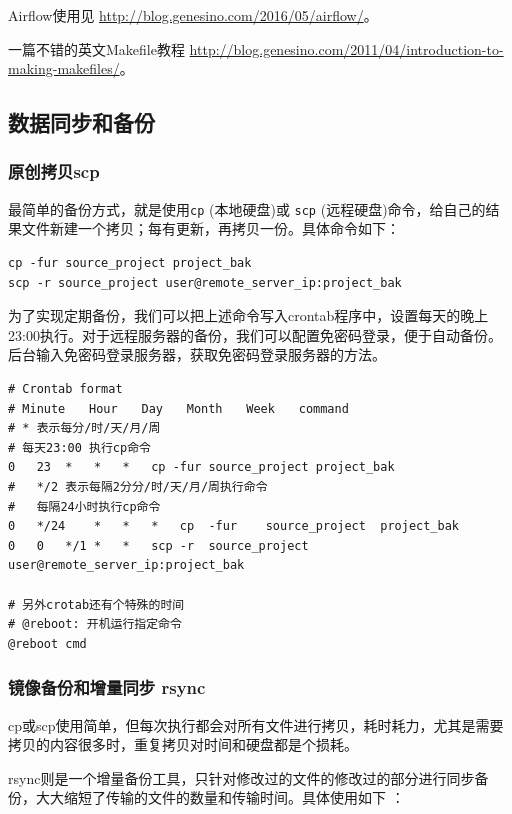 \documentclass[]{article}
\numberwithin{figure}{section}
\numberwithin{table}{section}
\begin{document}
Airflow使用见 \url{http://blog.genesino.com/2016/05/airflow/}。

一篇不错的英文Makefile教程 \url{http://blog.genesino.com/2011/04/introduction-to-making-makefiles/}。

\hypertarget{rsync}{%
\subsection{数据同步和备份}\label{rsync}}

\hypertarget{scp}{%
\subsubsection{原创拷贝scp}\label{scp}}

最简单的备份方式，就是使用\texttt{cp} (本地硬盘)或 \texttt{scp} (远程硬盘)命令，给自己的结果文件新建一个拷贝；每有更新，再拷贝一份。具体命令如下：

\begin{verbatim}
cp -fur source_project project_bak
scp -r source_project user@remote_server_ip:project_bak
\end{verbatim}

为了实现定期备份，我们可以把上述命令写入crontab程序中，设置每天的晚上23:00执行。对于远程服务器的备份，我们可以配置免密码登录，便于自动备份。后台输入免密码登录服务器，获取免密码登录服务器的方法。

\begin{verbatim}
# Crontab format
# Minute　　Hour　　Day　　Month　　Week　　command 
# * 表示每分/时/天/月/周
# 每天23:00 执行cp命令
0	23	*	*	*	cp -fur source_project project_bak
#	*/2	表示每隔2分分/时/天/月/周执行命令
#	每隔24小时执行cp命令
0	*/24	*	*	*	cp	-fur	source_project	project_bak
0	0	*/1	*	*	scp	-r	source_project	user@remote_server_ip:project_bak

# 另外crotab还有个特殊的时间
# @reboot: 开机运行指定命令
@reboot cmd
\end{verbatim}

\hypertarget{rsync1}{%
\subsubsection{镜像备份和增量同步 rsync}\label{rsync1}}

cp或scp使用简单，但每次执行都会对所有文件进行拷贝，耗时耗力，尤其是需要拷贝的内容很多时，重复拷贝对时间和硬盘都是个损耗。

rsync则是一个增量备份工具，只针对修改过的文件的修改过的部分进行同步备份，大大缩短了传输的文件的数量和传输时间。具体使用如下 ：
\end{document}

